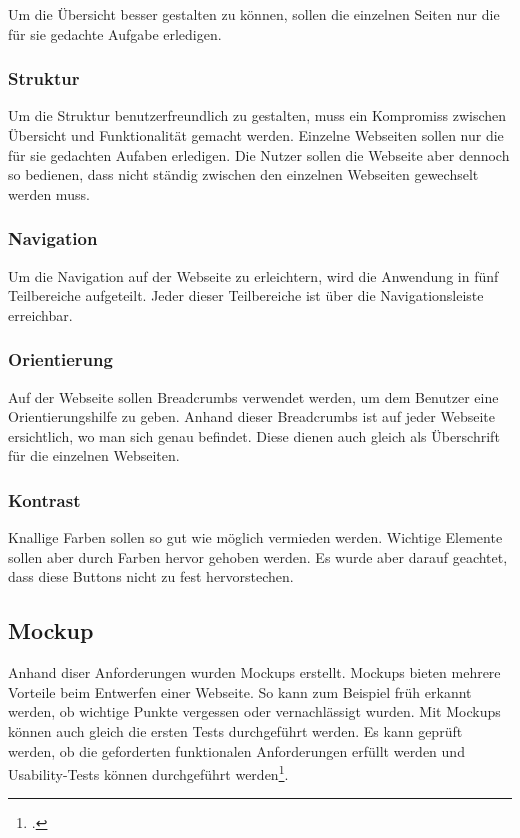 Um die Übersicht besser gestalten zu können, sollen die einzelnen Seiten nur die für sie gedachte Aufgabe erledigen.

\subsubsection*{Struktur}
Um die Struktur benutzerfreundlich zu gestalten, muss ein Kompromiss zwischen Übersicht und Funktionalität gemacht werden. Einzelne Webseiten sollen nur die für sie gedachten Aufaben erledigen. Die Nutzer sollen die Webseite aber dennoch so bedienen, dass nicht ständig zwischen den einzelnen Webseiten gewechselt werden muss.

		
\subsubsection*{Navigation}
Um die Navigation auf der Webseite zu erleichtern, wird die Anwendung in fünf Teilbereiche aufgeteilt. Jeder dieser Teilbereiche ist über die Navigationsleiste erreichbar. 
		
\subsubsection*{Orientierung}
Auf der Webseite sollen Breadcrumbs verwendet werden, um dem Benutzer eine Orientierungshilfe zu geben. Anhand dieser Breadcrumbs ist auf jeder Webseite ersichtlich, wo man sich genau befindet. Diese dienen auch gleich als Überschrift für die einzelnen Webseiten.

\subsubsection*{Kontrast}
Knallige Farben sollen so gut wie möglich vermieden werden. Wichtige Elemente sollen aber durch Farben hervor gehoben werden. Es wurde aber darauf geachtet, dass diese Buttons nicht zu fest hervorstechen. 


\subsection{Mockup}
Anhand diser Anforderungen wurden Mockups erstellt. Mockups bieten mehrere Vorteile beim Entwerfen einer Webseite. So kann zum Beispiel früh erkannt werden, ob wichtige Punkte vergessen oder vernachlässigt wurden. Mit Mockups können auch gleich die ersten Tests durchgeführt werden. Es kann geprüft werden, ob die geforderten funktionalen Anforderungen erfüllt werden und Usability-Tests können durchgeführt werden\footcite{dist}. \\

